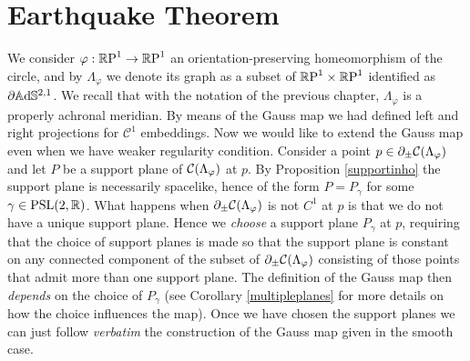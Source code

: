

\section{Earthquake Theorem}\label{quakesection}
We consider $\varphi:\S\to\S$ an orientation-preserving homeomorphism of the circle, and by $\Lambda_\varphi$ we denote its graph as a subset of $\T$ identified as $\partial\A^{2,1}$. We recall that with the notation of the previous chapter, $\Lambda_\varphi$ is a properly achronal meridian. By means of the Gauss map we had defined left and right projections for $\mathcal{C}^1$ embeddings.
Now we would like to extend the Gauss map even when we have weaker regularity condition. Consider a point $p \in \partial_\pm\CF$ and let $P$ be a support plane of $\CF$ at $p$. By Proposition \ref{supportinho} the support plane is necessarily spacelike, hence of the form $P=P_\gamma$ for some $\gamma\in\PSL$. What happens when $\partial_\pm\CF$ is not $C^1$ at $p$ is that we do not have a unique support plane. Hence we \textit{choose} a support plane $P_\gamma$ at $p$, requiring that the choice of support planes is made so that the support plane is constant on any connected component of the subset of $\partial_\pm\CF$ consisting of those points that admit more than one support plane. The definition of the Gauss map then \textit{depends} on the choice of $P_\gamma$ (see Corollary \ref{multipleplanes} for more details on how the choice influences the map). Once we have chosen the support planes we can just follow \textit{verbatim} the construction of the Gauss map given in the smooth case.

